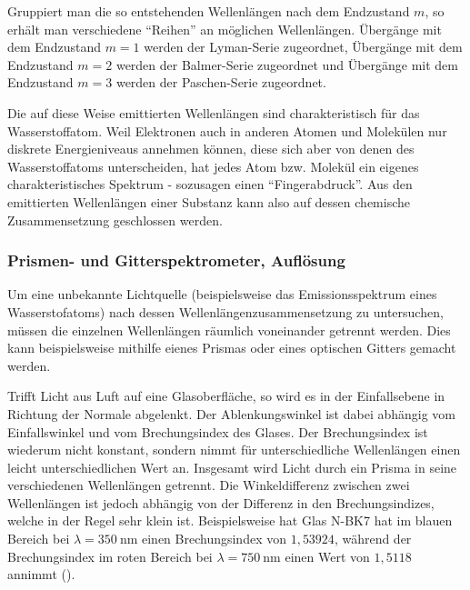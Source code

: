 \documentclass{article}
\begin{document}
Gruppiert man die so entstehenden Wellenlängen nach dem Endzustand $m$,
so erhält man verschiedene ``Reihen'' an möglichen Wellenlängen.
Übergänge mit dem Endzustand $m = 1$ werden der Lyman-Serie zugeordnet,
Übergänge mit dem Endzustand $m = 2$ werden der Balmer-Serie zugeordnet und
Übergänge mit dem Endzustand $m = 3$ werden der Paschen-Serie zugeordnet.

Die auf diese Weise emittierten Wellenlängen sind charakteristisch für das
Wasserstoffatom. Weil Elektronen auch in anderen Atomen und Molekülen
nur diskrete Energieniveaus annehmen können, diese sich aber von denen des
Wasserstoffatoms unterscheiden, hat jedes Atom bzw. Molekül ein eigenes
charakteristisches Spektrum - sozusagen einen ``Fingerabdruck''.
Aus den emittierten Wellenlängen einer Substanz kann also auf dessen chemische
Zusammensetzung geschlossen werden.

\subsubsection{Prismen- und Gitterspektrometer, Auflösung}

Um eine unbekannte Lichtquelle (beispielsweise das Emissionsspektrum eines
Wasserstofatoms) nach dessen Wellenlängenzusammensetzung zu untersuchen,
müssen die einzelnen Wellenlängen räumlich voneinander getrennt werden.
Dies kann beispielsweise mithilfe eienes Prismas oder eines optischen
Gitters gemacht werden.

Trifft Licht aus Luft auf eine Glasoberfläche, so wird es in der Einfallsebene
in Richtung der Normale abgelenkt. Der Ablenkungswinkel ist dabei abhängig vom
Einfallswinkel und vom Brechungsindex des Glases. Der Brechungsindex ist
wiederum nicht konstant, sondern nimmt für unterschiedliche Wellenlängen einen
leicht unterschiedlichen Wert an.
Insgesamt wird Licht durch ein Prisma in seine verschiedenen Wellenlängen getrennt.
Die Winkeldifferenz zwischen zwei Wellenlängen ist jedoch abhängig von der
Differenz in den Brechungsindizes, welche in der Regel sehr klein ist.
Beispielsweise hat Glas N-BK7 hat im blauen Bereich bei $\lambda = \qty{350}{\nm}$
einen Brechungsindex von $1,53924$, während der Brechungsindex im roten Bereich
bei $\lambda = \qty{750}{\nm}$ einen Wert von $1,5118$ annimmt (\cite{refractive}).
\end{document}
